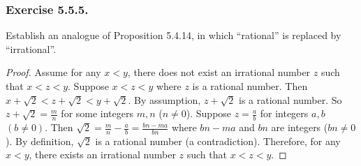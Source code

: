 \documentclass[12pt, letter]{article}
\begin{document}
\subsubsection*{Exercise 5.5.5.}
Establish an analogue of Proposition 5.4.14, in which ``rational'' is replaced by ``irrational''.
\begin{proof}
    Assume for any $x<y$, there does not exist an irrational number $z$ such that $x<z<y$. Suppose $x<z<y$ where $z$ is a rational number. Then $x+\sqrt{2}<z+\sqrt{2}<y+\sqrt{2}$. By assumption,
    $z+\sqrt{2}$ is a rational number. So $z+\sqrt{2}=\frac{m}{n}$ for some integers $m,n$ ($n\ne 0$). Suppose $z=\frac{a}{b}$ for integers $a,b$ $(b\ne 0)$.
    Then $\sqrt{2}=\frac{m}{n}-\frac{a}{b}=\frac{bn-ma}{bn}$ where $bn-ma$ and $bn$ are integers ($bn\ne 0$). By definition, $\sqrt{2}$ is a rational number (a contradiction).
    Therefore, for any $x<y$, there exists an irrational number $z$ such that $x<z<y$.
\end{proof}
\end{document}
